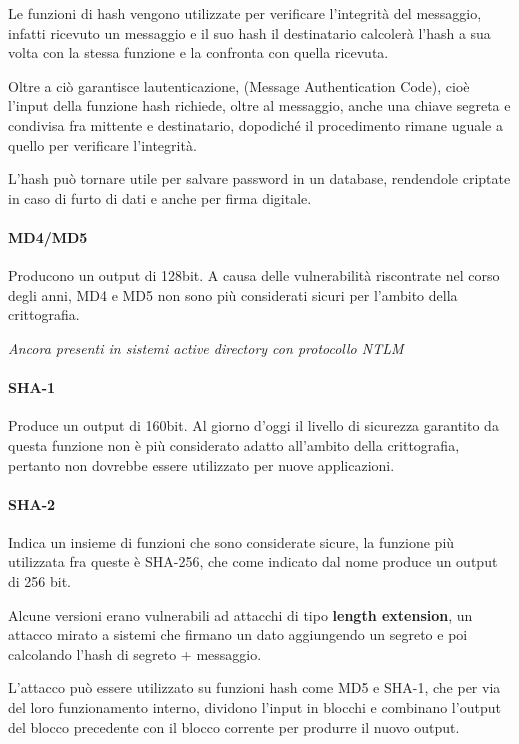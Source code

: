 Le funzioni di hash vengono utilizzate per verificare l'integrità del
messaggio, infatti ricevuto un messaggio e il suo hash il destinatario
calcolerà l'hash a sua volta con la stessa funzione e la confronta con
quella ricevuta.

Oltre a ciò garantisce l\textquotesingle autenticazione, (Message
Authentication Code), cioè l'input della funzione hash richiede, oltre
al messaggio, anche una chiave segreta e condivisa fra mittente e
destinatario, dopodiché il procedimento rimane uguale a quello per
verificare l'integrità.

L'hash può tornare utile per salvare password in un database, rendendole
criptate in caso di furto di dati e anche per firma digitale.

\paragraph{MD4/MD5}\label{md4md5}

Producono un output di 128bit. A causa delle vulnerabilità riscontrate
nel corso degli anni, MD4 e MD5 non sono più considerati sicuri per
l'ambito della crittografia.

\emph{Ancora presenti in sistemi active directory con protocollo NTLM}

\paragraph{SHA-1}\label{sha-1}

Produce un output di 160bit. Al giorno d'oggi il livello di sicurezza
garantito da questa funzione non è più considerato adatto all'ambito
della crittografia, pertanto non dovrebbe essere utilizzato per nuove
applicazioni.

\paragraph{SHA-2}\label{sha-2}

Indica un insieme di funzioni che sono considerate sicure, la funzione
più utilizzata fra queste è SHA-256, che come indicato dal nome produce
un output di 256 bit.

Alcune versioni erano vulnerabili ad attacchi di tipo \textbf{length
extension}, un attacco mirato a sistemi che firmano un dato aggiungendo
un segreto e poi calcolando l'hash di segreto + messaggio.

L'attacco può essere utilizzato su funzioni hash come MD5 e SHA-1, che
per via del loro funzionamento interno, dividono l'input in blocchi e
combinano l'output del blocco precedente con il blocco corrente per
produrre il nuovo output.

